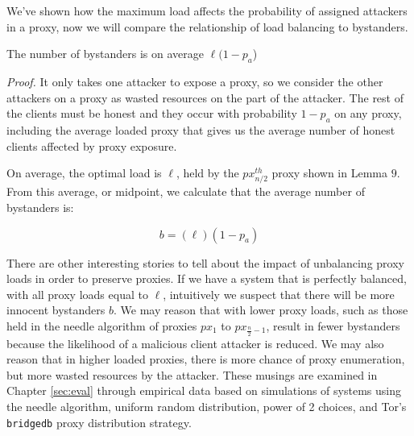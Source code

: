 We've shown how the maximum load affects the probability of assigned attackers in a proxy, now we will compare the relationship of load balancing to bystanders. 

\begin{theorem}{The number of bystanders is on average $\ell (1-p_a$)}

\end{theorem}

\textit{Proof.} It only takes one attacker to expose a proxy, so we consider the other attackers on a proxy as wasted resources on the part of the attacker. The rest of the clients must be honest and they occur with probability $1-p_a$ on any proxy, including the average loaded proxy that gives us the average number of honest clients affected by proxy exposure. 

On average, the optimal load is $\ell$, held by the $px_{n/2}^{th}$ proxy shown in Lemma $9$. From this average, or midpoint, we calculate that the average number of bystanders is:

$$b = (\ell)(1 - p_a)$$

There are other interesting stories to tell about the impact of unbalancing proxy loads in order to preserve proxies. If we have a system that is perfectly balanced, with all proxy loads equal to $\ell$, intuitively we suspect that there will be more innocent bystanders $b$. We may reason that with lower proxy loads, such as those held in the needle algorithm of proxies $px_1$ to $px_{\frac{n}{2}-1}$, result in fewer bystanders because the likelihood of a malicious client attacker is reduced. We may also reason that in higher loaded proxies, there is more chance of proxy enumeration, but more wasted resources by the attacker. These musings are examined in Chapter \ref{sec:eval} through empirical data based on simulations of systems using the needle algorithm, uniform random distribution, power of 2 choices, and Tor's \texttt{bridgedb} proxy distribution strategy. 